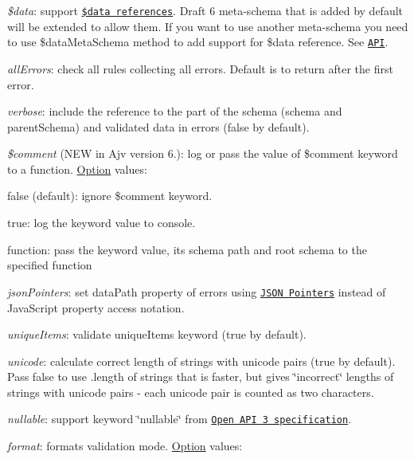\begin{DoxyItemize}
\item {\itshape \$data}\+: support \href{#data-reference}{\tt \$data references}. Draft 6 meta-\/schema that is added by default will be extended to allow them. If you want to use another meta-\/schema you need to use \$data\+Meta\+Schema method to add support for \$data reference. See \href{#api}{\tt A\+PI}.
\item {\itshape all\+Errors}\+: check all rules collecting all errors. Default is to return after the first error.
\item {\itshape verbose}\+: include the reference to the part of the schema ({\ttfamily schema} and {\ttfamily parent\+Schema}) and validated data in errors (false by default).
\item {\itshape \$comment} (N\+EW in Ajv version 6.)\+: log or pass the value of {\ttfamily \$comment} keyword to a function. \mbox{\hyperlink{structOption}{Option}} values\+:
\begin{DoxyItemize}
\item {\ttfamily false} (default)\+: ignore \$comment keyword.
\item {\ttfamily true}\+: log the keyword value to console.
\item function\+: pass the keyword value, its schema path and root schema to the specified function
\end{DoxyItemize}
\item {\itshape json\+Pointers}\+: set {\ttfamily data\+Path} property of errors using \href{https://tools.ietf.org/html/rfc6901}{\tt J\+S\+ON Pointers} instead of Java\+Script property access notation.
\item {\itshape unique\+Items}\+: validate {\ttfamily unique\+Items} keyword (true by default).
\item {\itshape unicode}\+: calculate correct length of strings with unicode pairs (true by default). Pass {\ttfamily false} to use {\ttfamily .length} of strings that is faster, but gives \char`\"{}incorrect\char`\"{} lengths of strings with unicode pairs -\/ each unicode pair is counted as two characters.
\item {\itshape nullable}\+: support keyword \char`\"{}nullable\char`\"{} from \href{https://swagger.io/docs/specification/data-models/data-types/}{\tt Open A\+PI 3 specification}.
\item {\itshape format}\+: formats validation mode. \mbox{\hyperlink{structOption}{Option}} values\+:
\begin{DoxyItemize}

\end{DoxyItemize}
\end{DoxyItemize}
